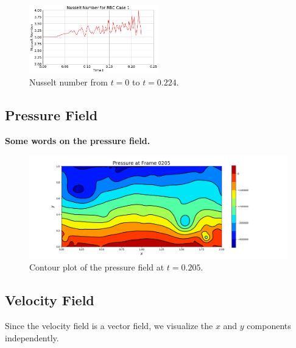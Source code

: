 \documentclass[11pt]{article} %
\begin{document}
\begin{figure}[h!]
\centering
\includegraphics[width=0.5\textwidth]{nusselt.png}
\caption{Nusselt number from $t=0$ to $t=0.224$.}
\end{figure}

\subsection{Pressure Field}
\textbf{Some words on the pressure field.}
\begin{figure}[h!]
\centering
\hspace*{-0.25in}
\includegraphics[width=1.2\textwidth]{pressure.png}
\caption{Contour plot of the pressure field at $t=0.205$.}
\end{figure}
\newpage

\subsection{Velocity Field}
Since the velocity field is a vector field, we visualize the $x$ and $y$ components independently. 
\end{document}
